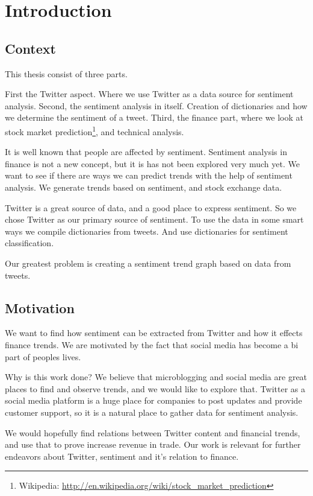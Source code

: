 \chapter{Introduction}\label{introduction}

\section{Context}
This thesis consist of three parts. 

First the Twitter aspect. Where we use Twitter as a data source for sentiment
analysis. Second, the sentiment analysis in itself. Creation of dictionaries
and how we determine the sentiment of a tweet. Third, the finance part, where we
look at stock market prediction\footnote{Wikipedia:
\url{http://en.wikipedia.org/wiki/stock_market_prediction}}, and technical
analysis. 

It is well known that people are affected by sentiment. Sentiment analysis in
finance is not a new concept, but it is has not been explored very much yet.
We want to see if there are ways we can predict trends with the help of
sentiment analysis. We generate trends based on sentiment, and stock exchange
data.  

Twitter is a great source of data, and a
good place to express sentiment. So we chose Twitter as our primary source of
sentiment. To use the data in some smart ways we compile dictionaries from
tweets. And use dictionaries for sentiment classification. 

Our greatest problem is creating a sentiment trend graph based on data from
tweets. 
%

\section{Motivation}
We want to find how sentiment can be extracted from Twitter and
how it effects finance trends. We are motivated by the fact that social media
has become a bi part of peoples lives. 

Why is this work done? We believe that microblogging and social media are great
places to find and observe trends, and we would like to explore that. Twitter as
a social media platform is a huge place for companies to post updates and
provide customer support, so it is a natural place to gather data for sentiment
analysis.

We would hopefully find relations between Twitter content and financial trends,
and use that to prove increase revenue in trade. Our work is relevant for
further endeavors about Twitter, sentiment and it's relation to finance.  

